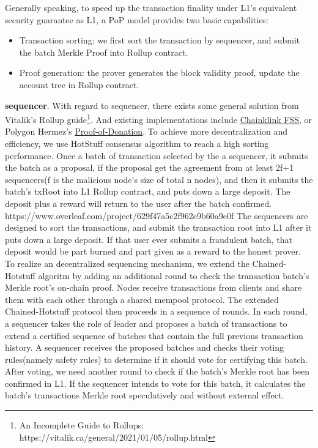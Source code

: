 \documentclass{article}
\begin{document}
Generally speaking, to speed up the transaction finality under L1's equivalent security guarantee as L1, a PoP model provides two basic capabilities:

\begin{itemize}
    \item Transaction sorting: we first sort the transaction by sequencer, and submit the batch Merkle Proof into Rollup contract.
    \item Proof generation: the prover generates the block validity proof, update the account tree in Rollup contract.
\end{itemize}


\noindent\textbf{sequencer}. With regard to sequencer, there exists some general solution from Vitalik's Rollup guide\footnote{An Incomplete Guide to Rollups: https://vitalik.ca/general/2021/01/05/rollup.html}. And existing implementations include \href{https://blog.chain.link/chainlink-fair-sequencing-services-enabling-a-provably-fair-defi-ecosystem/}{Chainklink FSS}, or Polygon Hermez's \href{https://blog.hermez.io/introducing-proof-of-donation/}{Proof-of-Donation}. To achieve more decentralization and efficiency, we use HotStuff \cite{yin2018hotstuff} consensus algorithm to reach a high sorting performance.  Once a batch of transaction selected by the a sequencer, it submits the batch as a proposal, if the proposal get the agreement from at least 2f+1 sequencers(f is the malicious node's size of total n nodes), and then it submits the batch's txRoot into L1 Rollup contract, and puts down a large deposit. The deposit plus a reward will return to the user after the batch confirmed.
https://www.overleaf.com/project/629f47a5c2f962e9b60a9e0f
The sequencers are designed to sort the transactions, and submit the transaction root into L1 after it puts down a large deposit. If that user ever submits a fraudulent batch, that deposit would be part burned and part given as a reward to the honest prover. To realize an decentralized sequencing mechanism, we extend the Chained-Hotstuff algoritm by adding an additional round to check the transaction batch's Merkle root's on-chain proof. Nodes receive transactions from clients and share them with each other through a shared mempool protocol. The extended Chained-Hotstuff protocol then proceeds in a sequence of rounds. In each round, a sequencer takes the role of leader and proposes a batch of transactions to extend a certified sequence of batches that contain the full previous transaction history. A sequencer receives the proposed batches and checks their voting rules(namely safety rules) to determine if it should vote for certifying this batch. After voting, we need another round to check if the batch's Merkle root has been confirmed in L1. If the sequencer intends to vote for this batch, it calculates the batch’s transactions Merkle root speculatively and without external effect. 
\end{document}

